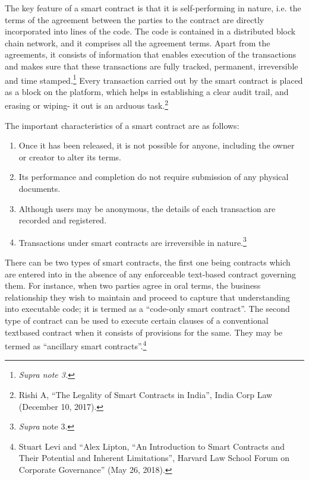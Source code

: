 \begin{multicols}{2}
\noi
The key feature of a smart contract is that it is self-performing in nature, i.e. the terms of the
agreement between the parties to the contract are directly incorporated into lines of the code.
The code is contained in a distributed block chain network, and it comprises all the agreement
terms. Apart from the agreements, it consists of information that enables execution of the
transactions and makes sure that these transactions are fully tracked, permanent, irreversible
and time stamped.\footnote{\textit{Supra note 3.}} Every transaction carried out by the smart contract is placed as a block on the platform, which helps in establishing a clear audit trail, and erasing or wiping- it out is
an arduous task.\footnote{Rishi A, “The Legality of Smart Contracts in India”, India Corp Law (December 10, 2017).}

\noi
The important characteristics of a smart contract are as follows:

\vspace{-.25cm}

\begin{enumerate}[label=$\bullet$]
\item Once it has been released, it is not possible for anyone, including the owner or creator to alter its terms.
\item Its performance and completion do not require submission of any physical documents.
\item Although users may be anonymous, the details of each transaction are recorded and registered.
\item Transactions under smart contracts are irreversible in nature.\footnote{\textit{Supra} note 3.}
\end{enumerate}

\vspace{-.25cm}

\noi
There can be two types of smart contracts, the first one being contracts which are entered into
in the absence of any enforceable text-based contract governing them. For instance, when two
parties agree in oral terms, the business relationship they wish to maintain and proceed to
capture that understanding into executable code; it is termed as a “code-only smart contract”.
The second type of contract can be used to execute certain clauses of a conventional textbased contract when it consists of provisions for the same. They may be termed as “ancillary
smart contracts”.\footnote{Stuart Levi and “Alex Lipton, “An Introduction to Smart Contracts and Their Potential and Inherent Limitations”, Harvard Law School Forum on Corporate Governance” (May 26, 2018).}


\end{multicols}
